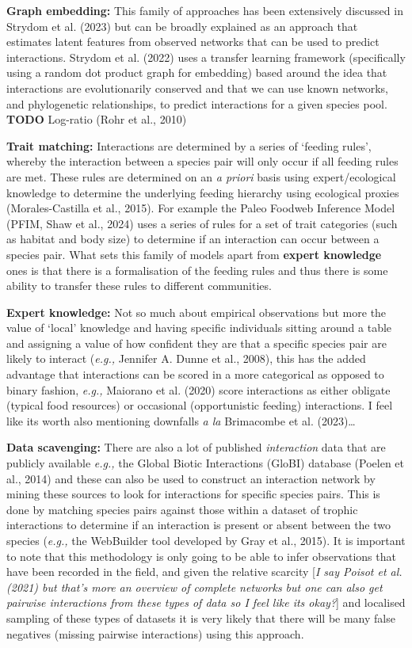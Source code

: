 \documentclass[
]{agujournal2019}
\begin{document}
\textbf{Graph embedding:} This family of approaches has been extensively
discussed in Strydom et al. (2023) but can be broadly explained as an
approach that estimates latent features from observed networks that can
be used to predict interactions. Strydom et al. (2022) uses a transfer
learning framework (specifically using a random dot product graph for
embedding) based around the idea that interactions are evolutionarily
conserved and that we can use known networks, and phylogenetic
relationships, to predict interactions for a given species pool.
\textbf{TODO} Log-ratio (Rohr et al., 2010)

\textbf{Trait matching:} Interactions are determined by a series of
`feeding rules', whereby the interaction between a species pair will
only occur if all feeding rules are met. These rules are determined on
an \emph{a priori} basis using expert/ecological knowledge to determine
the underlying feeding hierarchy using ecological proxies
(Morales-Castilla et al., 2015). For example the Paleo Foodweb Inference
Model (PFIM, Shaw et al., 2024) uses a series of rules for a set of
trait categories (such as habitat and body size) to determine if an
interaction can occur between a species pair. What sets this family of
models apart from \textbf{expert knowledge} ones is that there is a
formalisation of the feeding rules and thus there is some ability to
transfer these rules to different communities.

\textbf{Expert knowledge:} Not so much about empirical observations but
more the value of `local' knowledge and having specific individuals
sitting around a table and assigning a value of how confident they are
that a specific species pair are likely to interact (\emph{e.g.,}
Jennifer A. Dunne et al., 2008), this has the added advantage that
interactions can be scored in a more categorical as opposed to binary
fashion, \emph{e.g.,} Maiorano et al. (2020) score interactions as
either obligate (typical food resources) or occasional (opportunistic
feeding) interactions. I feel like its worth also mentioning downfalls
\emph{a la} Brimacombe et al. (2023)\ldots{}

\textbf{Data scavenging:} There are also a lot of published
\emph{interaction} data that are publicly available \emph{e.g.,} the
Global Biotic Interactions (GloBI) database (Poelen et al., 2014) and
these can also be used to construct an interaction network by mining
these sources to look for interactions for specific species pairs. This
is done by matching species pairs against those within a dataset of
trophic interactions to determine if an interaction is present or absent
between the two species (\emph{e.g.,} the WebBuilder tool developed by
Gray et al., 2015). It is important to note that this methodology is
only going to be able to infer observations that have been recorded in
the field, and given the relative scarcity {[}\emph{I say Poisot et al.
(2021) but that's more an overview of complete networks but one can also
get pairwise interactions from these types of data so I feel like its
okay?}{]} and localised sampling of these types of datasets it is very
likely that there will be many false negatives (missing pairwise
interactions) using this approach.
\end{document}
